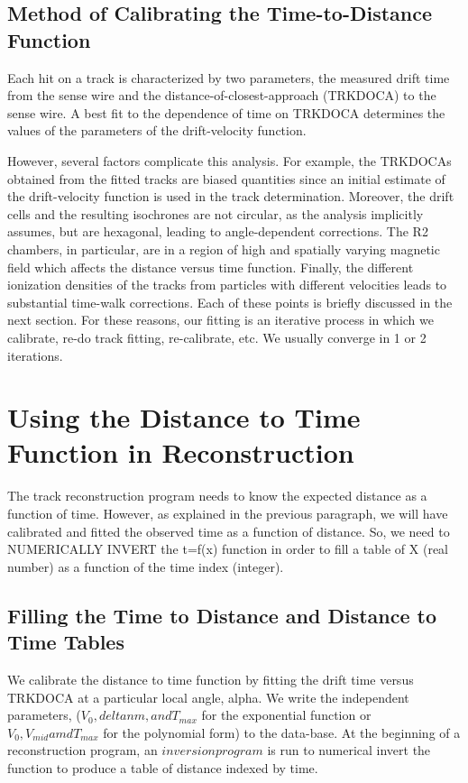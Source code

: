 \documentclass{article}
\begin{document}
\subsection{Method of Calibrating the Time-to-Distance Function}
\label{tdistcal}

Each hit on a track is characterized by two parameters, the measured drift 
time from the sense wire and the distance-of-closest-approach (TRKDOCA) to the 
sense wire.  A best fit to the dependence of time on TRKDOCA determines the
values of the parameters of the drift-velocity function. 

However, several factors 
complicate this analysis. For example, the TRKDOCAs obtained from the fitted 
tracks are biased quantities since an initial estimate of the drift-velocity 
function is used in the track determination.  Moreover, the drift cells and
the resulting isochrones are 
not circular, as the analysis implicitly assumes, but are hexagonal, leading 
to angle-dependent corrections.   The R2 chambers, in particular, are in a 
region of high and spatially varying magnetic field which affects the distance
versus time function.  Finally, the different 
ionization densities of the tracks from particles with different velocities 
leads to substantial time-walk corrections.  Each of 
these points is briefly discussed in the next section.
For these reasons, our fitting is an iterative process in which we calibrate,
re-do track fitting, re-calibrate, etc.  We usually converge in 1 or 2 iterations.

\section{Using the Distance to Time Function in Reconstruction}
The track reconstruction program needs to know the expected distance as a function
of time.  However, as explained in the previous paragraph, we will have calibrated and fitted
the observed time as a function of distance.  So, we need to NUMERICALLY INVERT the t=f(x)
function in order to fill a table of X (real number) as a function of the time index (integer).

\subsection{Filling the Time to Distance and Distance to Time Tables}
We calibrate the distance to time function by fitting the drift time versus
TRKDOCA at a particular local angle, alpha.  We write the independent parameters,
($V_0, deltanm, and T_{max}$ for the exponential function or $V_0, V_{mid} amd T_{max}$ for
the polynomial form) to the data-base.  At the beginning of a reconstruction program,
an $inversion program$ is run to numerical invert the function to produce a table
of distance indexed by time.
\end{document}
